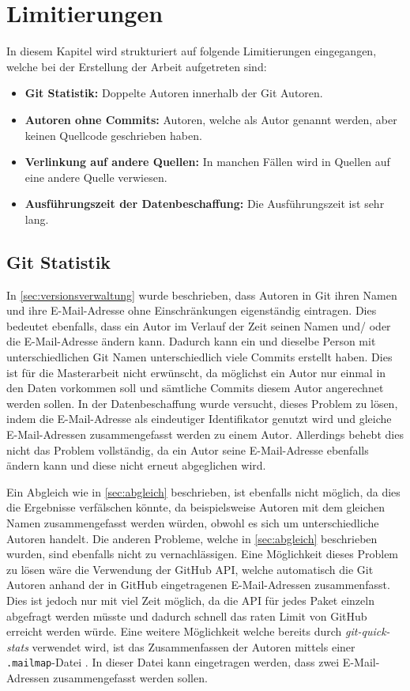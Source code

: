 \section{Limitierungen}
\label{sec:limitierungen}
In diesem Kapitel wird strukturiert auf folgende Limitierungen eingegangen, welche bei der Erstellung der Arbeit aufgetreten sind:
\begin{itemize}
    \item \textbf{Git Statistik:} Doppelte Autoren innerhalb der Git Autoren.
    \item \textbf{Autoren ohne Commits:} Autoren, welche als Autor genannt werden, aber keinen Quellcode geschrieben haben.
    \item \textbf{Verlinkung auf andere Quellen:} In manchen Fällen wird in Quellen auf eine andere Quelle verwiesen.
    \item \textbf{Ausführungszeit der Datenbeschaffung:} Die Ausführungszeit ist sehr lang.
\end{itemize}

\subsection*{Git Statistik}
\label{sec:git_statistik}
In \autoref{sec:versionsverwaltung} wurde beschrieben, dass Autoren in Git ihren Namen und ihre E-Mail-Adresse ohne Einschränkungen eigenständig eintragen.
Dies bedeutet ebenfalls, dass ein Autor im Verlauf der Zeit seinen Namen und/ oder die E-Mail-Adresse ändern kann.
Dadurch kann ein und dieselbe Person mit unterschiedlichen Git Namen unterschiedlich viele Commits erstellt haben.
Dies ist für die Masterarbeit nicht erwünscht, da möglichst ein Autor nur einmal in den Daten vorkommen soll und sämtliche Commits diesem Autor angerechnet werden sollen.
In der Datenbeschaffung wurde versucht, dieses Problem zu lösen, indem die E-Mail-Adresse als eindeutiger Identifikator genutzt wird und gleiche E-Mail-Adressen zusammengefasst werden zu einem Autor.
Allerdings behebt dies nicht das Problem vollständig, da ein Autor seine E-Mail-Adresse ebenfalls ändern kann und diese nicht erneut abgeglichen wird.

Ein Abgleich wie in \autoref{sec:abgleich} beschrieben, ist ebenfalls nicht möglich, da dies die Ergebnisse verfälschen könnte, da beispielsweise Autoren mit dem gleichen Namen zusammengefasst werden würden, obwohl es sich um unterschiedliche Autoren handelt.
Die anderen Probleme, welche in \autoref{sec:abgleich} beschrieben wurden, sind ebenfalls nicht zu vernachlässigen.
Eine Möglichkeit dieses Problem zu lösen wäre die Verwendung der GitHub API, welche automatisch die Git Autoren anhand der in GitHub eingetragenen E-Mail-Adressen zusammenfasst.
Dies ist jedoch nur mit viel Zeit möglich, da die API für jedes Paket einzeln abgefragt werden müsste und dadurch schnell das raten Limit von GitHub erreicht werden würde.
Eine weitere Möglichkeit welche bereits durch \emph{git-quick-stats} verwendet wird, ist das Zusammenfassen der Autoren mittels einer \texttt{.mailmap}-Datei \autocite{chacon_git_2024-1}.
In dieser Datei kann eingetragen werden, dass zwei E-Mail-Adressen zusammengefasst werden sollen.

